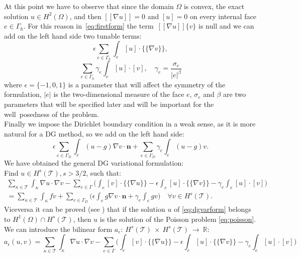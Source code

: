 \documentclass[12pt, a4paper]{article}
\theoremstyle{definition}
\theoremstyle{plain}
\theoremstyle{plain}
\theoremstyle{definition}
\begin{document}
At this point we have to observe that since the domain $\Omega$ is convex, the 
exact solution $u \in H^2(\Omega)$, and then $[\![\nabla u]\!] = 0$ and $[u] = 
0$ on every internal face $e \in \Gamma_h$. For this reason 
in~\eqref{eq:firstform} the term~$[\![ \nabla u ]\!] \{v\}$ is null and we can 
add on the left hand side two tunable terms:
\begin{equation*}
	\epsilon \sum_{e \in \Gamma_h} \int_e [u] \cdot \{\!\!\{ \nabla v \}\!\!\},
\end{equation*}
\begin{equation*}
	\sum_{e \in \Gamma_h} \gamma_e \int_e [u] \cdot [v], \quad \gamma_e = 
	\frac{\sigma_e}{|e|^\beta}
\end{equation*}
where $\epsilon = \{-1, 0, 1\}$ is a parameter that will affect the symmetry of 
the formulation, $|e|$ is the two-dimensional measure of the face $e$, 
$\sigma_e$ and $\beta$ are two parameters that will be specified later and will 
be important for the well~posedness of the problem.\\
Finally we impose the Dirichlet boundary condition in a weak sense, as it is 
more natural for a DG method, so we add on the left hand side:
\begin{equation*}
	\epsilon \sum_{e \in \Gamma_D} \int_e (u-g) \nabla v \cdot \mathbf{n}
	+ \sum_{e \in \Gamma_D} \gamma_e \int_e (u-g)v.
\end{equation*}
We have obtained the general DG variational formulation:\\
Find $u \in H^s(\mathcal{T}), s>3/2$, such that:
\begin{multline*}
	\sum_{\kappa \in \mathcal{T}} \int_\kappa \nabla u \cdot \nabla v 
	-\sum_{e \in \Gamma} \bigg( \int_e [v] \cdot \{\!\!\{ \nabla u \}\!\!\}
	-\epsilon \int_e [u] \cdot \{\!\!\{ \nabla v \}\!\!\}
	- \gamma_e \int_e [u] \cdot [v] \bigg)\\
	= \sum_{\kappa \in \mathcal{T}} \int_\kappa fv
	+ \sum_{e \in \Gamma_D} \bigg( \epsilon \int_e g \nabla v \cdot \mathbf{n}
	+ \gamma_e \int_e gv \bigg) \quad \forall v \in H^s(\mathcal{T}).
\end{multline*}
Viceversa it can be proved (see \cite{riviere}) that if the solution 
$u$ of 
\eqref{eq:dgvarform} belongs to $H^1(\Omega) \cap H^s(\mathcal{T})$, then $u$ 
is the solution of the Poisson problem \eqref{eq:poisson}.\\
We can introduce the bilinear form $a_\epsilon:~H^s(\mathcal{T})~\times~H^s(\mathcal{T})~\rightarrow~\mathbb{R}$:
\begin{equation*}
a_\epsilon(u, v) = \sum_{\kappa \in \mathcal{T}} \int_\kappa \nabla u \cdot \nabla v
-\sum_{e \in \Gamma} \bigg( \int_e [v] \cdot \{\!\!\{ \nabla u \}\!\!\}
-\epsilon \int_e [u] \cdot \{\!\!\{ \nabla v \}\!\!\}
- \gamma_e \int_e [u]\cdot[v] \bigg)
\end{equation*}
\end{document}
